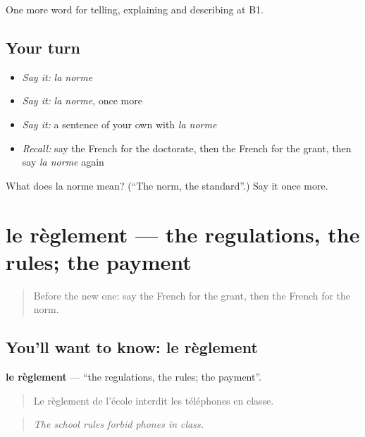 \begin{grammarlens}[title={What you've built}]
One more word for telling, explaining and describing at B1.
\end{grammarlens}

\subsection*{Your turn}
\begin{itemize}
\raggedright
  \item \emph{Say it:} \emph{la norme}
  \item \emph{Say it:} \emph{la norme}, once more
  \item \emph{Say it:} a sentence of your own with \emph{la norme}
  \item \emph{Recall:} say the French for the doctorate, then the French for the grant, then say \emph{la norme} again
\end{itemize}

\begin{tcolorbox}[breakable,colback=teal!4,colframe=teal!35!black,title={Before you move on}]
What does la norme mean? (\textquotedblleft{}The norm, the standard\textquotedblright{}.) Say it once more.
\end{tcolorbox}
\section[le règlement]{le règlement — the regulations, the rules; the payment}

\label{lesson:FR-C380-reglement}



\begin{quote}
Before the new one: say the French for the grant, then the French for the norm.
\end{quote}

\subsection*{You'll want to know: le règlement}
\textbf{le règlement} — \textquotedblleft{}the regulations, the rules; the payment\textquotedblright{}.

\begin{quote}
Le règlement de l'école interdit les téléphones en classe.
\end{quote}

\begin{quote}
\emph{The school rules forbid phones in class.}
\end{quote}

